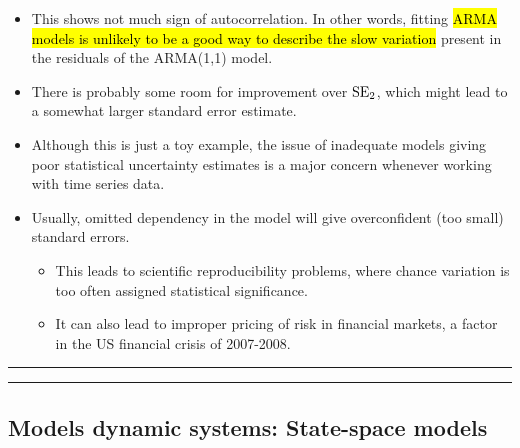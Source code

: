 \documentclass[]{article}
\begin{document}
\begin{itemize}
\item
  This shows not much sign of autocorrelation. In other words, fitting
  \hl{ARMA models is unlikely to be a good way to describe the slow
  variation} present in the residuals of the ARMA(1,1) model.
\item
  There is probably some room for improvement over \(\mathrm{SE}_2\), which
  might lead to a somewhat larger standard error estimate.
\item
  Although this is just a toy example, the issue of inadequate models
  giving poor statistical uncertainty estimates is a major concern
  whenever working with time series data.
\item
  Usually, omitted dependency in the model will give overconfident (too
  small) standard errors.

  \begin{itemize}
  \item
    This leads to scientific reproducibility problems, where chance
    variation is too often assigned statistical significance.
  \item
    It can also lead to improper pricing of risk in financial markets, a
    factor in the US financial crisis of 2007-2008.
  \end{itemize}
\end{itemize}

\begin{center}\rule{0.5\linewidth}{\linethickness}\end{center}

\begin{center}\rule{0.5\linewidth}{\linethickness}\end{center}

\subsection{Models dynamic systems: State-space
models}\label{models-dynamic-systems-state-space-models}
\end{document}
